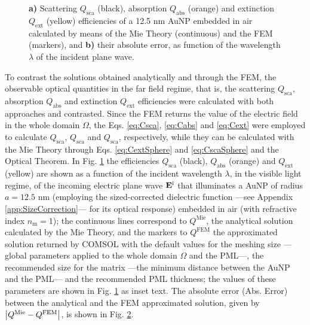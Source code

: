 \begin{figure}[b!]
 \def\svgwidth{.9\textwidth}
 \small
 \centering
    \hspace*{-.95\textwidth}
     \begin{subfigure}{\textwidth}\caption{}\label{fig:Eff:First:a}\end{subfigure}\\[11.5em]
    \hspace*{-.95\textwidth}
     \begin{subfigure}{\textwidth}\caption{}\label{fig:Eff:First:b}\end{subfigure}\\[-15em]
\caption[Scattering, Absorption and Extinction Efficiencies of a 12.5 nm AuNP$@$Air: Analytical and FEM solutions with no optimization]{\textbf{a)} Scattering $Q_\text{sca}$ (black), absorption $Q_\text{abs}$ (orange) and extinction $Q_\text{ext}$ (yellow) efficiencies of a 12.5 nm AuNP embedded in air calculated by means of the Mie Theory (continuous) and the FEM (markers), and \textbf{b)} their absolute error, as function of the wavelength $\lambda$ of the incident plane wave.}
\label{fig:Eff:First}
\end{figure}
%

To contrast the solutions obtained analytically and through the FEM, the observable optical quantities in the far field regime, that is, the scattering $Q_\text{sca}$, absorption $Q_\text{abs}$ and extinction $Q_\text{ext}$ efficiencies were calculated with both approaches and contrasted. Since the FEM returns the value of the electric field in the whole domain $\Omega$, the Eqs. \eqref{eq:Csca}, \eqref{eq:Cabs} and \eqref{eq:Cext} were employed to calculate $Q_\text{sca}$, $Q_\text{sca}$ and $Q_\text{sca}$, respectively, while they can be calculated with the Mie Theory through Eqs. \eqref{eq:CextSphere} and \eqref{eq:CscaSphere} and the Optical Theorem. In Fig. \ref{fig:Eff:First:a} the efficiencies  $Q_\text{sca}$ (black),  $Q_\text{abs}$ (orange) and $Q_\text{ext}$ (yellow) are shown as a function of the incident wavelength $\lambda$, in the visible light regime,  of the incoming electric plane wave $\vb{E}^\text{i}$ that illuminates a AuNP of radius $a = 12.5$ nm (employing the sized-corrected dielectric function ---see Appendix \ref{app:SizeCorrection}--- for its optical response) embedded in air (with refractive index $n_\text{m} = 1$); the continuous lines correspond to $Q^\text{Mie}$, the analytical solution calculated by the Mie Theory, and the markers to $Q^\text{FEM}$ the approximated solution returned by COMSOL with the default values for the meshing size ---global parameters applied to the whole domain $\Omega$ and the PML---, the recommended size for the matrix ---the minimum distance between the AuNP and the PML--- and the recommended PML thickness; the values of these parameters are shown in Fig. \ref{fig:Eff:First:a} as inset text. The absolute error (Abs. Error) between the analytical and the FEM  approximated solution, given by $\abs{Q^\text{Mie}-Q^\text{FEM}}$, is shown in Fig. \ref{fig:Eff:First:b}.

